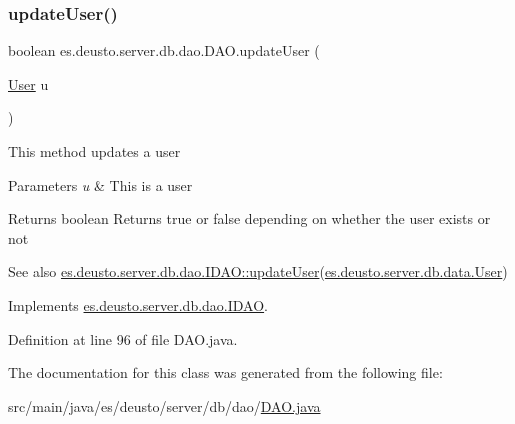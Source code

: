 \subsubsection{\texorpdfstring{update\+User()}{updateUser()}}
{\footnotesize\ttfamily boolean es.\+deusto.\+server.\+db.\+dao.\+D\+A\+O.\+update\+User (\begin{DoxyParamCaption}\item[{\hyperlink{classes_1_1deusto_1_1server_1_1db_1_1data_1_1_user}{User}}]{u }\end{DoxyParamCaption})}

This method updates a user 
\begin{DoxyParams}{Parameters}
{\em u} & This is a user \\
\hline
\end{DoxyParams}
\begin{DoxyReturn}{Returns}
boolean Returns true or false depending on whether the user exists or not 
\end{DoxyReturn}
\begin{DoxySeeAlso}{See also}
\hyperlink{interfacees_1_1deusto_1_1server_1_1db_1_1dao_1_1_i_d_a_o_a790b00e2989b634c1bbb2c6620ff3583}{es.\+deusto.\+server.\+db.\+dao.\+I\+D\+A\+O\+::update\+User}(\hyperlink{classes_1_1deusto_1_1server_1_1db_1_1data_1_1_user}{es.\+deusto.\+server.\+db.\+data.\+User}) 
\end{DoxySeeAlso}


Implements \hyperlink{interfacees_1_1deusto_1_1server_1_1db_1_1dao_1_1_i_d_a_o_a790b00e2989b634c1bbb2c6620ff3583}{es.\+deusto.\+server.\+db.\+dao.\+I\+D\+AO}.



Definition at line 96 of file D\+A\+O.\+java.



The documentation for this class was generated from the following file\+:\begin{DoxyCompactItemize}
\item 
src/main/java/es/deusto/server/db/dao/\hyperlink{_d_a_o_8java}{D\+A\+O.\+java}\end{DoxyCompactItemize}
